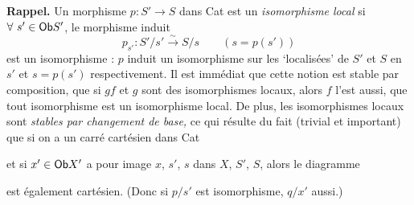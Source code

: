 \textbf{Rappel.} Un morphisme $p : S' \longrightarrow S$ dans Cat est un \textit{isomorphisme local} si $\forall\ s' \in \mathsf{Ob} S'$, le morphisme induit
\[
p_{s'} : S'/s' \xrightarrow{\sim} S/s \qquad (s = p(s'))
\]
est un isomorphisme : $p$ induit un isomorphisme sur les ‘localisées’ de $S'$ et $S$ en $s'$ et $s = p(s')$ respectivement. Il est immédiat que cette notion est stable par composition, que si $gf$ et $g$ sont des isomorphismes locaux, alors $f$ l'est aussi, que tout isomorphisme est un isomorphisme local. De plus, les isomorphismes locaux sont \textit{stables par changement de base,} ce qui résulte du fait (trivial et important) que si on a un carré cartésien dans Cat

\begin{center}
\end{center}

et si $x' \in \mathsf{Ob} X'$ a pour image $x$, $s'$, $s$ dans $X$, $S'$, $S$, alors le diagramme

\begin{center}
\end{center}

est également cartésien. (Donc si $p/s'$ est isomorphisme, $q/x'$ aussi.)

